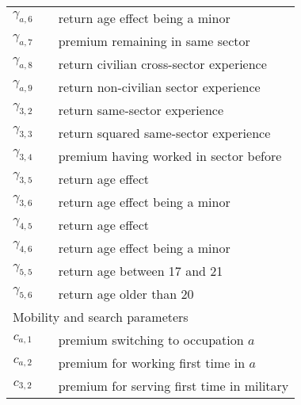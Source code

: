 \begin{ThreePartTable}
\begin{longtable}{@{}cll@{}}
$\gamma_{a,6}$       &  & return age effect being a minor               										\\
$\gamma_{a,7}$       &  & premium remaining in same sector              								   \\
$\gamma_{a,8}$       &  & return civilian cross-sector experience       								    \\
$\gamma_{a,9}$       &  & return non-civilian sector experience       										 \\
$\gamma_{3,2}$       &  & return same-sector experience                 									  \\
$\gamma_{3,3}$       &  & return squared same-sector experience    										 \\
$\gamma_{3,4}$       &  & premium having worked in sector before   										\\
$\gamma_{3,5}$       &  & return age effect                             												 \\
$\gamma_{3,6}$       &  & return age effect being a minor              	   										\\
$\gamma_{4,5}$       &  & return age effect                             												 \\
$\gamma_{4,6}$       &  & return age effect being a minor                  										\\
$\gamma_{5,5}$       &  & return age between 17 and 21                 	  									   \\
$\gamma_{5,6}$       &  & return age older than 20							   										\\[7.5pt] \midrule
\multicolumn{3}{l}{Mobility and search parameters}          													  \\ \midrule 
$c_{a,1}$            &  & premium switching to occupation $a$           									   \\
$c_{a,2}$            &  & premium for working first time in $a$         										  \\
$c_{3,2}$            &  & premium for serving first time in military    										  \\[7.5pt]


\end{longtable}
\end{ThreePartTable}
